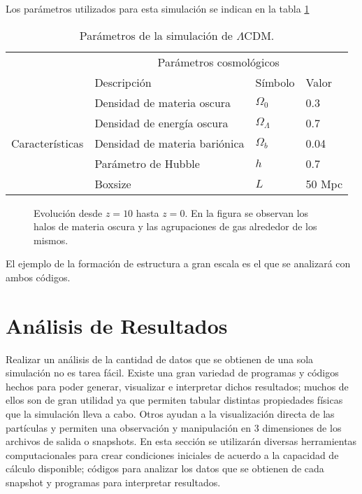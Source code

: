 \documentclass[a4paper,openright,12pt]{book}
\begin{document}

Los parámetros utilizados para esta simulación se indican en la tabla \ref{tabla 3.1}
\begin{table}[htb]
\centering
\begin{tabular}{|l|l|l|l|}
\hline
& \multicolumn{3}{c|}{Parámetros cosmológicos} \\
\cline{2-4}
& Descripción & Símbolo & Valor\\
\hline \hline
\multirow{5}{3cm}{Características} & Densidad de materia oscura & $\Omega_{0}$ & 0.3\\ \cline{2-4}
& Densidad de energía oscura & $\Omega_{\Lambda} $ & 0.7\\ \cline{2-4}
& Densidad de materia bariónica & $\Omega_{b}$ & 0.04\\ \cline{2-4}
& Parámetro de Hubble & $h$ & 0.7 \\ \cline{2-4}
& Boxsize & $L$ & 50 Mpc\\ \cline{1-4}
\end{tabular}
\caption{Parámetros de la simulación de $\Lambda$CDM.}
\label{tabla 3.1}
\end{table}


\begin{figure}[htpb]
\centering
{}
\caption{\footnotesize{Evolución desde $z=10$ hasta $z = 0$. En la figura se observan los halos de materia oscura y las agrupaciones de gas alrededor de los mismos.}} \label{fig 3.5}
\end{figure}
El ejemplo de la formación de estructura a gran escala es el que se analizará con ambos códigos. 
\chapter{Análisis de Resultados}
Realizar un análisis de la cantidad de datos que se obtienen de una sola simulación no es tarea fácil. Existe una gran variedad de programas y códigos hechos para poder generar, visualizar e interpretar dichos resultados; muchos de ellos son de gran utilidad ya que permiten tabular distintas propiedades físicas que la simulación lleva a cabo. Otros ayudan a la visualización directa de las partículas y permiten una observación  y manipulación en 3 dimensiones de los archivos de salida o \textsf{snapshots}. En esta sección se utilizarán diversas herramientas computacionales para crear condiciones iniciales de acuerdo a la capacidad de cálculo disponible; códigos para analizar los datos que se obtienen de cada snapshot y programas para interpretar resultados.
\end{document}
